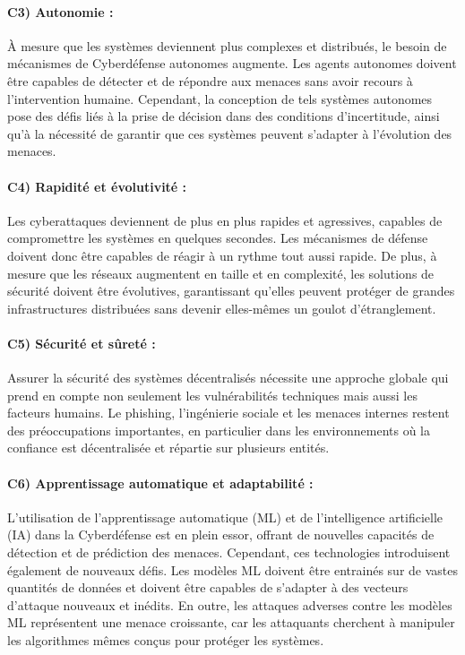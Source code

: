 \paragraph{C3) Autonomie :}
À mesure que les systèmes deviennent plus complexes et distribués, le besoin de mécanismes de Cyberdéfense autonomes augmente. Les agents autonomes doivent être capables de détecter et de répondre aux menaces sans avoir recours à l'intervention humaine. Cependant, la conception de tels systèmes autonomes pose des défis liés à la prise de décision dans des conditions d'incertitude, ainsi qu'à la nécessité de garantir que ces systèmes peuvent s'adapter à l'évolution des menaces.

\paragraph{C4) Rapidité et évolutivité :}
Les cyberattaques deviennent de plus en plus rapides et agressives, capables de compromettre les systèmes en quelques secondes. Les mécanismes de défense doivent donc être capables de réagir à un rythme tout aussi rapide. De plus, à mesure que les réseaux augmentent en taille et en complexité, les solutions de sécurité doivent être évolutives, garantissant qu'elles peuvent protéger de grandes infrastructures distribuées sans devenir elles-mêmes un goulot d'étranglement.

\paragraph{C5) Sécurité et sûreté :}
Assurer la sécurité des systèmes décentralisés nécessite une approche globale qui prend en compte non seulement les vulnérabilités techniques mais aussi les facteurs humains. Le phishing, l'ingénierie sociale et les menaces internes restent des préoccupations importantes, en particulier dans les environnements où la confiance est décentralisée et répartie sur plusieurs entités.

\paragraph{C6) Apprentissage automatique et adaptabilité :}
L’utilisation de l’apprentissage automatique (ML) et de l’intelligence artificielle (IA) dans la Cyberdéfense est en plein essor, offrant de nouvelles capacités de détection et de prédiction des menaces. Cependant, ces technologies introduisent également de nouveaux défis. Les modèles ML doivent être entrainés sur de vastes quantités de données et doivent être capables de s’adapter à des vecteurs d’attaque nouveaux et inédits. En outre, les attaques adverses contre les modèles ML représentent une menace croissante, car les attaquants cherchent à manipuler les algorithmes mêmes conçus pour protéger les systèmes.

